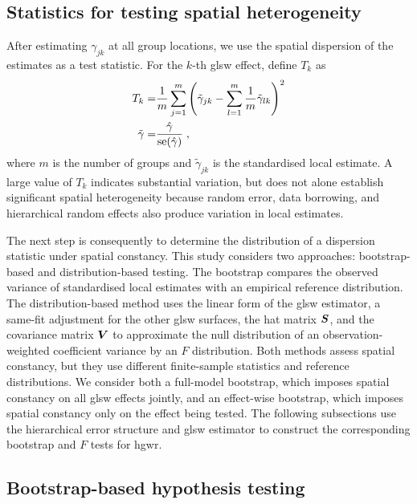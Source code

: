 \documentclass[times]{interact}
\theoremstyle{plain}%
\theoremstyle{definition}
\theoremstyle{remark}
\begin{document}
\subsection{Statistics for testing spatial heterogeneity}\label{sec:heterogeneity-testing-logic}

After estimating $\gamma_{jk}$ at all group locations, we use the spatial dispersion of the estimates as a test statistic.
For the $k$-th \gls{glsw} effect, define $T_k$ as
\begin{equation}\label{equ:heterogeneity-core-statistic}
  \begin{split}
    T_k = & \frac{1}{m}\sum_{j=1}^{m}\left(\tilde{\gamma}_{jk}-\sum_{l=1}^{m} \frac{1}{m}\tilde{\gamma}_{lk} \right)^2 \\
    \tilde{\gamma} = & \frac{\hat{\gamma}}{\operatorname{se}(\hat{\gamma})} \; ,
  \end{split}
\end{equation}
where $m$ is the number of groups and $\tilde{\gamma}_{jk}$ is the standardised local estimate.
A large value of $T_k$ indicates substantial variation, but does not alone establish significant spatial heterogeneity because random error, data borrowing, and hierarchical random effects also produce variation in local estimates.

The next step is consequently to determine the distribution of a dispersion statistic under spatial constancy.
This study considers two approaches: bootstrap-based and distribution-based testing.
The bootstrap compares the observed variance of standardised local estimates with an empirical reference distribution.
The distribution-based method uses the linear form of the \gls{glsw} estimator, a same-fit adjustment for the other \gls{glsw} surfaces, the hat matrix $\bm{S}$, and the covariance matrix $\bm{V}$ to approximate the null distribution of an observation-weighted coefficient variance by an $F$ distribution.
Both methods assess spatial constancy, but they use different finite-sample statistics and reference distributions.
We consider both a full-model bootstrap, which imposes spatial constancy on all \gls{glsw} effects jointly, and an effect-wise bootstrap, which imposes spatial constancy only on the effect being tested.
The following subsections use the hierarchical error structure and \gls{glsw} estimator to construct the corresponding bootstrap and $F$ tests for \gls{hgwr}.

\subsection{Bootstrap-based hypothesis testing}\label{sec:test-hgwr-glsw-boot}
\end{document}
